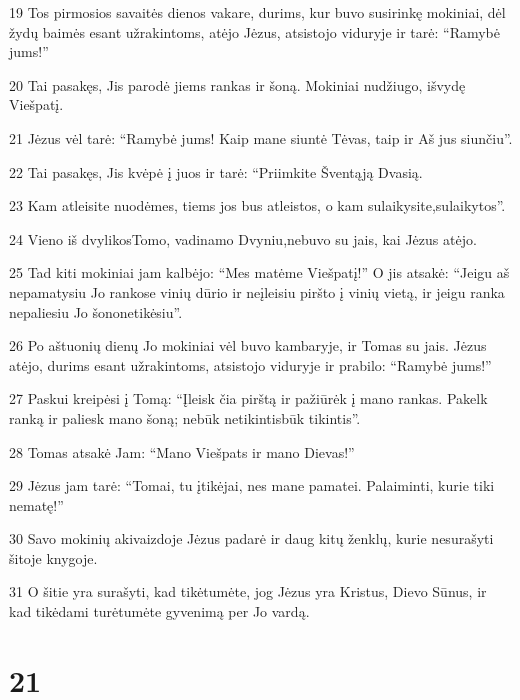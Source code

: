 \par 19 Tos pirmosios savaitės dienos vakare, durims, kur buvo susirinkę mokiniai, dėl žydų baimės esant užrakintoms, atėjo Jėzus, atsistojo viduryje ir tarė: “Ramybė jums!” 
\par 20 Tai pasakęs, Jis parodė jiems rankas ir šoną. Mokiniai nudžiugo, išvydę Viešpatį. 
\par 21 Jėzus vėl tarė: “Ramybė jums! Kaip mane siuntė Tėvas, taip ir Aš jus siunčiu”. 
\par 22 Tai pasakęs, Jis kvėpė į juos ir tarė: “Priimkite Šventąją Dvasią. 
\par 23 Kam atleisite nuodėmes, tiems jos bus atleistos, o kam sulaikysite,­sulaikytos”. 
\par 24 Vieno iš dvylikos­Tomo, vadinamo Dvyniu,­nebuvo su jais, kai Jėzus atėjo. 
\par 25 Tad kiti mokiniai jam kalbėjo: “Mes matėme Viešpatį!” O jis atsakė: “Jeigu aš nepamatysiu Jo rankose vinių dūrio ir neįleisiu piršto į vinių vietą, ir jeigu ranka nepaliesiu Jo šono­netikėsiu”. 
\par 26 Po aštuonių dienų Jo mokiniai vėl buvo kambaryje, ir Tomas su jais. Jėzus atėjo, durims esant užrakintoms, atsistojo viduryje ir prabilo: “Ramybė jums!” 
\par 27 Paskui kreipėsi į Tomą: “Įleisk čia pirštą ir pažiūrėk į mano rankas. Pakelk ranką ir paliesk mano šoną; nebūk netikintis­būk tikintis”. 
\par 28 Tomas atsakė Jam: “Mano Viešpats ir mano Dievas!” 
\par 29 Jėzus jam tarė: “Tomai, tu įtikėjai, nes mane pamatei. Palaiminti, kurie tiki nematę!” 
\par 30 Savo mokinių akivaizdoje Jėzus padarė ir daug kitų ženklų, kurie nesurašyti šitoje knygoje. 
\par 31 O šitie yra surašyti, kad tikėtumėte, jog Jėzus yra Kristus, Dievo Sūnus, ir kad tikėdami turėtumėte gyvenimą per Jo vardą.


\chapter{21}


